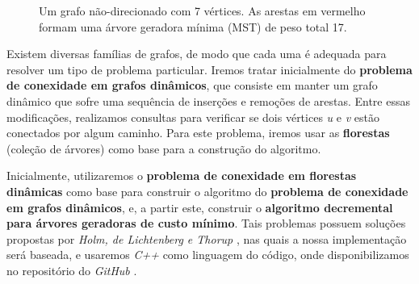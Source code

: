 \begin{figure}
    \centering
    \caption{Um grafo não-direcionado com 7 vértices. As arestas em vermelho formam uma árvore geradora mínima (MST) de peso total 17.}
    \label{fig:mst_example}
\end{figure}

Existem diversas famílias de grafos, de modo que cada uma é adequada para resolver um tipo de problema particular. Iremos tratar inicialmente do \textbf{problema de conexidade em grafos dinâmicos}, que consiste em manter um grafo dinâmico que sofre uma sequência de inserções e remoções de arestas. Entre essas modificações, realizamos consultas para verificar se dois vértices \textit{u} e \textit{v} estão conectados por algum caminho. Para este problema, iremos usar as \textbf{florestas} (coleção de árvores) como base para a construção do algoritmo.

Inicialmente, utilizaremos o \textbf{problema de conexidade em florestas dinâmicas} como base para construir o algoritmo do \textbf{problema de conexidade em grafos dinâmicos}, e, a partir este, construir o \textbf{algoritmo decremental para árvores geradoras de custo mínimo}. Tais problemas possuem soluções propostas por \textit{Holm, de Lichtenberg e Thorup} \cite{jacob_holm}, nas quais a nossa implementação será baseada, e usaremos \textit{C++} como linguagem do código, onde disponibilizamos no repositório do \textit{GitHub} \cite{chung2025}.